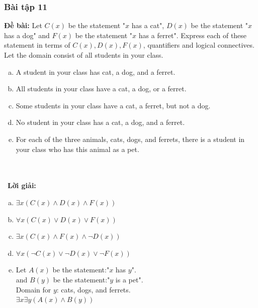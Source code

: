 \documentclass[a4paper]{article}
\begin{document}
\subsubsection{Bài tập 11}
\textbf{Đề bài:} Let $C(x)$ be the statement "$x$ has a cat", $D(x)$ be the statement "$x$ has a dog" and $F(x)$ be the statement "$x$ has a ferret". Express each of these statement in terms of $C(x),D(x),F(x)$, quantifiers and logical connectives. Let the domain consist of all students in your class.
\begin{enumerate}[a)]
	\item A student in your class has cat, a dog, and a ferret.
	\item All students in your class have a cat, a dog, or a ferret.
	\item  Some students in your class have a cat, a ferret, but not a dog.
	\item No student in your class has a cat, a dog, and a ferret.
	\item For each of the three animals, cats, dogs, and ferrets, there is a student in your class who has this animal as a pet.
	\end{enumerate}
\\\ \\\
\textbf{Lời giải:} \begin{enumerate}[a)]
	\item $\exists x(C(x) \land D(x) \land F(x))$
	\item $\forall x(C(x) \lor D(x) \lor F(x))$
	\item $\exists x(C(x) \land F(x) \land \lnot D(x))$
	\item $\forall x(\lnot C(x) \lor \lnot D(x) \lor \lnot F(x))$
	\item Let $A(x)$ be the statement:"$x$ has $y$".\\
	and $B(y)$ be the statement:"$y$ is a pet".\\
	Domain for $y$: cats, dogs, and ferrets.\\
	$\exists x \exists y (A(x) \land B(y))$
	\end{enumerate} \\\ \\\
\clearpage
\end{document}
